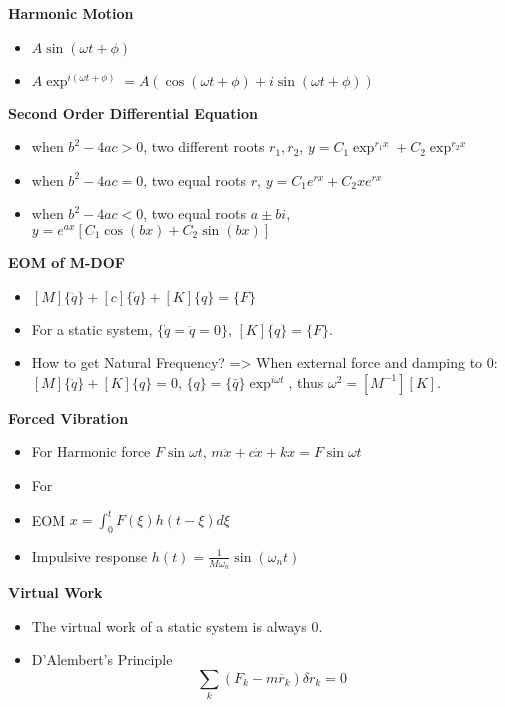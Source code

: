 \documentclass{article}
\begin{document}
\thispagestyle{empty}

\begin{multicols*}{2}

  \noindent\textbf{Harmonic Motion}
  \begin{itemize}
    \item $A \sin(\omega t + \phi)$
    \item $A \exp^{i(\omega t + \phi)} = A(\cos(\omega t + \phi) + i\sin(\omega t + \phi))$
  \end{itemize}

  \noindent\textbf{Second Order Differential Equation}
  \begin{itemize}
  \item when $b^2 - 4ac > 0$, two different roots $r_1, r_2$, $y = C_1\exp^{r_1 x} + C_2\exp^{r_2 x}$
  \item when $b^2 - 4ac = 0$, two equal roots $r$, $y = C_1 e^{r x} + C_2 x e^{r x}$
  \item when $b^2 - 4ac < 0$, two equal roots $a \pm bi$, $y = e^{ax} [C_1 \cos(b x) + C_2 \sin(b x)]$
  \end{itemize}

  \noindent\textbf{EOM of M-DOF}
  \begin{itemize}
  \item $[M]\{\ddot{q}\} + [c]\{\dot{q}\} + [K]\{q\}=\{F\}$
  \item For a static system, $\{\dot{q} = \ddot{q} = 0\}$, $[K]\{q\}=\{F\}$.
  \item How to get Natural Frequency? => When external force and damping to 0:
    $[M]\{\ddot{q}\} + [K]\{q\} = 0$, $\{q\} = \{\bar{q}\}\exp^{i\omega t}$, thus $\omega^2 = [M^{-1}][K]$.
  \end{itemize}

  \noindent\textbf{Forced Vibration}
  \begin{itemize}
  \item For Harmonic force $F\sin\omega t$, $m\ddot{x} + c\dot{x} + kx = F\sin\omega t$
    \item For
  \item EOM $x = \int_0^t F(\xi) h(t-\xi) d\xi$
  \item Impulsive response $h(t) = \frac{1}{M\omega_n}\sin(\omega_n t)$

  \end{itemize}

  \noindent\textbf{Virtual Work}
  \begin{itemize}
  \item The virtual work of a static system is always 0.
  \item D'Alembert's Principle
    \begin{equation*}
      \sum_k (F_k - m \ddot{r_k}) \delta r_k = 0
    \end{equation*}
  \end{itemize}


\end{multicols*}
\end{document}
